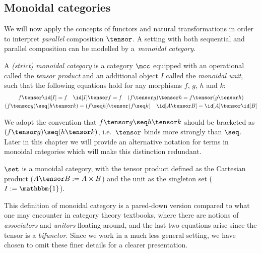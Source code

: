 \begin{example}[Reduce]

\end{example}

\subsection{Monoidal categories}

We will now apply the concepts of functors and natural transformations in order
to interpret \emph{parallel} composition \(\tensor\).
A setting with both sequential and parallel composition can be modelled by a\
\emph{monoidal category}.

\begin{definition}
    \label{def:monoidal-category}
    A \emph{(strict) monoidal category} is a category \(\mcc\) equipped with an
    operational called the \emph{tensor product} and an additional object \(I\)
    called the \emph{monoidal unit}, such that the following equations hold for
    any morphisms \(f\), \(g\), \(h\) and \(k\):
    \begin{gather*}
        f \tensor \id[I] = f
        \quad
        \id[I] \tensor f = f
        \quad
        (f \tensor g) \tensor h = f \tensor (g \tensor h)
        \\
        (f \tensor g) \seq (h \tensor k) = (f \seq h) \tensor (f \seq k)
        \quad
        \id[A \tensor B] = \id[A] \tensor \id[B]
    \end{gather*}
\end{definition}

We adopt the convention that \(f \tensor g \seq h \tensor k\) should be
bracketed as \((f \tensor g) \seq (h \tensor k)\), i.e.\ \(\tensor\) binds
more strongly than \(\seq\).
Later in this chapter we will provide an alternative notation for terms
in monoidal categories which will make this distinction redundant.

\begin{example}[Fold]

\end{example}

\begin{example}
    \(\set\) is a monoidal category, with the tensor product defined as the
    Cartesian product (\(A \tensor B := A \times B\)) and the unit as the
    singleton set (\(I := \mathbbm{1}\)).
\end{example}

\begin{remark}
    This definition of monoidal category is a pared-down version compared to
    what one may encounter in category theory textbooks, where there are notions
    of \emph{associators} and \emph{unitors} floating around, and the last two
    equations arise since the tensor is a \emph{bifunctor}.
    Since we work in a much less general setting, we have chosen to omit these
    finer details for a clearer presentation.
\end{remark}

